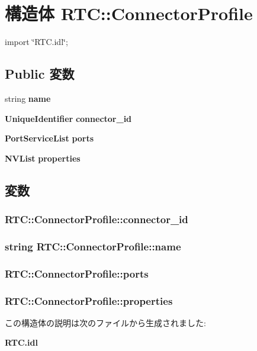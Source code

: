 \section{構造体 RTC::ConnectorProfile}
\label{structRTC_1_1ConnectorProfile}


{\ttfamily import \char`\"{}RTC.idl\char`\"{};}

\subsection*{Public 変数}
\begin{DoxyCompactItemize}
\item 
string {\bf name}
\item 
{\bf UniqueIdentifier} {\bf connector\_\-id}
\item 
{\bf PortServiceList} {\bf ports}
\item 
{\bf NVList} {\bf properties}
\end{DoxyCompactItemize}


\subsection{変数}
\subsubsection[{connector\_\-id}]{ {\bf RTC::ConnectorProfile::connector\_\-id}}\label{structRTC_1_1ConnectorProfile_a35ab0f337d42a13f145884b8d1fb0ceb}
\subsubsection[{name}]{\setlength{\rightskip}{0pt plus 5cm}string {\bf RTC::ConnectorProfile::name}}\label{structRTC_1_1ConnectorProfile_a7388e47fe2c24d93b0f583cb13a18b52}
\subsubsection[{ports}]{ {\bf RTC::ConnectorProfile::ports}}\label{structRTC_1_1ConnectorProfile_a84117d3a0082f25b2846a35c23cf54ac}
\subsubsection[{properties}]{ {\bf RTC::ConnectorProfile::properties}}\label{structRTC_1_1ConnectorProfile_a7968dd3b23e93c8c5af7b2762bbd4e80}


この構造体の説明は次のファイルから生成されました:\begin{DoxyCompactItemize}
\item 
{\bf RTC.idl}\end{DoxyCompactItemize}
